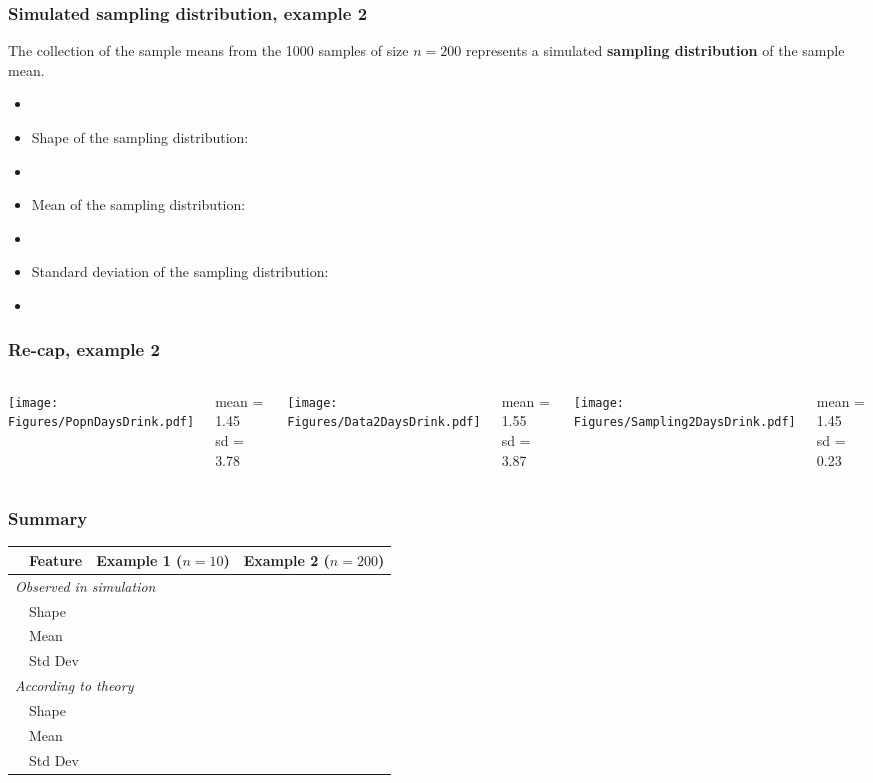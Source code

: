 \begin{frame}
\frametitle{Simulated sampling distribution, example 2}
The collection of the sample means from the 1000 samples of size $n=200$ represents a simulated \textbf{sampling distribution} of the sample mean.
\begin{itemize}
    \item[]
    \item
    Shape of the sampling distribution:
    \item[]
    \item
    Mean of the sampling distribution:
    \item[]
    \item
    Standard deviation of the sampling distribution:
    \item[]
\end{itemize}
\end{frame}

\begin{frame}
\frametitle{Re-cap, example 2}
\begin{columns}
\texttt{[image: Figures/PopnDaysDrink.pdf]}
\hspace*{0.3in}
\begin{flushright}
    mean = 1.45\\
     sd  = 3.78
\end{flushright}
\texttt{[image: Figures/Data2DaysDrink.pdf]}
\begin{flushright}
    mean = 1.55\\
     sd  = 3.87
\end{flushright}
\texttt{[image: Figures/Sampling2DaysDrink.pdf]}
\begin{flushright}
    mean = 1.45\\
     sd  = 0.23
\end{flushright}
\end{columns}
\end{frame}


\begin{frame}
\frametitle{Summary}
{\renewcommand{\arraystretch}{1.5}
\begin{tabular}{p{0.1cm} p{2cm} p{3.7cm} p{3.7cm}}
\toprule
& Feature & Example 1 ($n=10$) & Example 2 ($n=200$) \\
\midrule
\multicolumn{3}{l}{\emph{Observed in simulation}}  \\
& Shape  & & \\
& Mean   & & \\
& Std Dev & & \\
\midrule
\multicolumn{3}{l}{\emph{According to theory}}  \\
& Shape  & & \\
& Mean   & & \\
& Std Dev & & \\
\bottomrule
\end{tabular}}
\end{frame}
